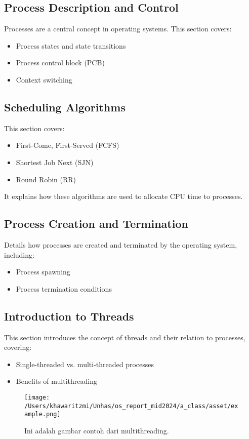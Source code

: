 \documentclass[12pt]{article}
\begin{document}
\subsection{Process Description and Control}
Processes are a central concept in operating systems. This section covers:
\begin{itemize}
    \item Process states and state transitions
    \item Process control block (PCB)
    \item Context switching
\end{itemize}

\subsection{Scheduling Algorithms}
This section covers:
\begin{itemize}
    \item First-Come, First-Served (FCFS)
    \item Shortest Job Next (SJN)
    \item Round Robin (RR)
\end{itemize}
It explains how these algorithms are used to allocate CPU time to processes.

\subsection{Process Creation and Termination}
Details how processes are created and terminated by the operating system, including:
\begin{itemize}
    \item Process spawning
    \item Process termination conditions
\end{itemize}

\subsection{Introduction to Threads}
This section introduces the concept of threads and their relation to processes, covering:
\begin{itemize}
    \item Single-threaded vs. multi-threaded processes
    \item Benefits of multithreading
\end{itemize}

\begin{figure}[h]
    \centering
    \texttt{[image: /Users/khawaritzmi/Unhas/os\_report\_mid2024/a\_class/asset/example.png]}  %
    \caption{Ini adalah gambar contoh dari multithreading.}
    \label{fig:contoh_gambar}
\end{figure}
\end{document}
